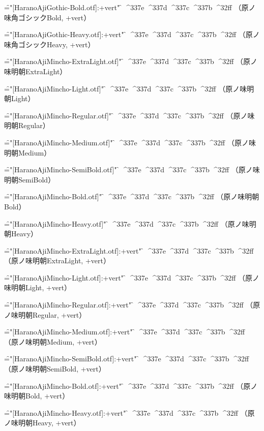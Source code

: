 \font\f="[HaranoAjiGothic-Bold.otf]:+vert" \f
^^^^337e
^^^^337d
^^^^337c
^^^^337b
^^^^32ff
（原ノ味角ゴシックBold, +vert）\par

\font\f="[HaranoAjiGothic-Heavy.otf]:+vert" \f
^^^^337e
^^^^337d
^^^^337c
^^^^337b
^^^^32ff
（原ノ味角ゴシックHeavy, +vert）\par


\font\f="[HaranoAjiMincho-ExtraLight.otf]" \f
^^^^337e
^^^^337d
^^^^337c
^^^^337b
^^^^32ff
（原ノ味明朝ExtraLight）\par

\font\f="[HaranoAjiMincho-Light.otf]" \f
^^^^337e
^^^^337d
^^^^337c
^^^^337b
^^^^32ff
（原ノ味明朝Light）\par

\font\f="[HaranoAjiMincho-Regular.otf]" \f
^^^^337e
^^^^337d
^^^^337c
^^^^337b
^^^^32ff
（原ノ味明朝Regular）\par

\font\f="[HaranoAjiMincho-Medium.otf]" \f
^^^^337e
^^^^337d
^^^^337c
^^^^337b
^^^^32ff
（原ノ味明朝Medium）\par

\font\f="[HaranoAjiMincho-SemiBold.otf]" \f
^^^^337e
^^^^337d
^^^^337c
^^^^337b
^^^^32ff
（原ノ味明朝SemiBold）\par

\font\f="[HaranoAjiMincho-Bold.otf]" \f
^^^^337e
^^^^337d
^^^^337c
^^^^337b
^^^^32ff
（原ノ味明朝Bold）\par

\font\f="[HaranoAjiMincho-Heavy.otf]" \f
^^^^337e
^^^^337d
^^^^337c
^^^^337b
^^^^32ff
（原ノ味明朝Heavy）\par


\font\f="[HaranoAjiMincho-ExtraLight.otf]:+vert" \f
^^^^337e
^^^^337d
^^^^337c
^^^^337b
^^^^32ff
（原ノ味明朝ExtraLight, +vert）\par

\font\f="[HaranoAjiMincho-Light.otf]:+vert" \f
^^^^337e
^^^^337d
^^^^337c
^^^^337b
^^^^32ff
（原ノ味明朝Light, +vert）\par

\font\f="[HaranoAjiMincho-Regular.otf]:+vert" \f
^^^^337e
^^^^337d
^^^^337c
^^^^337b
^^^^32ff
（原ノ味明朝Regular, +vert）\par

\font\f="[HaranoAjiMincho-Medium.otf]:+vert" \f
^^^^337e
^^^^337d
^^^^337c
^^^^337b
^^^^32ff
（原ノ味明朝Medium, +vert）\par

\font\f="[HaranoAjiMincho-SemiBold.otf]:+vert" \f
^^^^337e
^^^^337d
^^^^337c
^^^^337b
^^^^32ff
（原ノ味明朝SemiBold, +vert）\par

\font\f="[HaranoAjiMincho-Bold.otf]:+vert" \f
^^^^337e
^^^^337d
^^^^337c
^^^^337b
^^^^32ff
（原ノ味明朝Bold, +vert）\par

\font\f="[HaranoAjiMincho-Heavy.otf]:+vert" \f
^^^^337e
^^^^337d
^^^^337c
^^^^337b
^^^^32ff
（原ノ味明朝Heavy, +vert）\par

\bye
